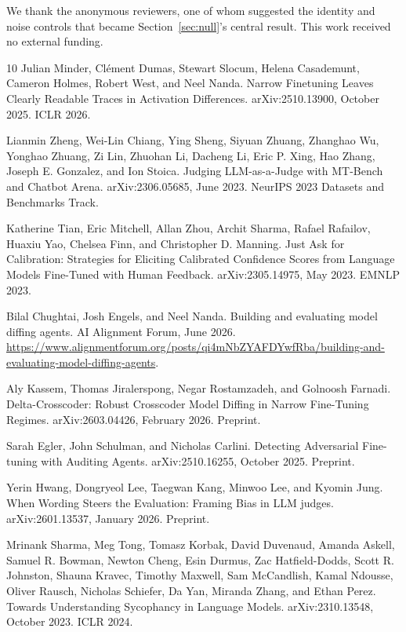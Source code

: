 \documentclass{article}
\begin{document}
\begin{ack}
We thank the anonymous reviewers, one of whom suggested the identity and noise
controls that became Section~\ref{sec:null}'s central result. This work received
no external funding.
\end{ack}

\begin{thebibliography}{10}
\small
{}
Julian Minder, Cl\'ement Dumas, Stewart Slocum, Helena Casademunt,
Cameron Holmes, Robert West, and Neel Nanda.
\newblock Narrow Finetuning Leaves Clearly Readable Traces in Activation
Differences.
\newblock arXiv:2510.13900, October 2025. ICLR 2026.

Lianmin Zheng, Wei-Lin Chiang, Ying Sheng, Siyuan Zhuang, Zhanghao Wu, Yonghao Zhuang, Zi Lin, Zhuohan Li, Dacheng Li, Eric P. Xing, Hao Zhang, Joseph E. Gonzalez, and Ion Stoica.
\newblock Judging LLM-as-a-Judge with MT-Bench and Chatbot Arena.
\newblock arXiv:2306.05685, June 2023. NeurIPS 2023 Datasets and Benchmarks Track.

Katherine Tian, Eric Mitchell, Allan Zhou, Archit Sharma, Rafael Rafailov, Huaxiu Yao, Chelsea Finn, and Christopher D. Manning.
\newblock Just Ask for Calibration: Strategies for Eliciting Calibrated Confidence Scores from Language Models Fine-Tuned with Human Feedback.
\newblock arXiv:2305.14975, May 2023. EMNLP 2023.

Bilal Chughtai, Josh Engels, and Neel Nanda.
\newblock Building and evaluating model diffing agents.
\newblock AI Alignment Forum, June 2026.
\newblock \url{https://www.alignmentforum.org/posts/qi4mNbZYAFDYwfRba/building-and-evaluating-model-diffing-agents}.

Aly Kassem, Thomas Jiralerspong, Negar Rostamzadeh, and Golnoosh Farnadi.
\newblock Delta-Crosscoder: Robust Crosscoder Model Diffing in Narrow
Fine-Tuning Regimes.
\newblock arXiv:2603.04426, February 2026. Preprint.

Sarah Egler, John Schulman, and Nicholas Carlini.
\newblock Detecting Adversarial Fine-tuning with Auditing Agents.
\newblock arXiv:2510.16255, October 2025. Preprint.

Yerin Hwang, Dongryeol Lee, Taegwan Kang, Minwoo Lee, and Kyomin Jung.
\newblock When Wording Steers the Evaluation: Framing Bias in LLM judges.
\newblock arXiv:2601.13537, January 2026. Preprint.

Mrinank Sharma, Meg Tong, Tomasz Korbak, David Duvenaud, Amanda Askell, Samuel R. Bowman, Newton Cheng, Esin Durmus, Zac Hatfield-Dodds, Scott R. Johnston, Shauna Kravec, Timothy Maxwell, Sam McCandlish, Kamal Ndousse, Oliver Rausch, Nicholas Schiefer, Da Yan, Miranda Zhang, and Ethan Perez.
\newblock Towards Understanding Sycophancy in Language Models.
\newblock arXiv:2310.13548, October 2023. ICLR 2024.


\end{thebibliography}
\end{document}
